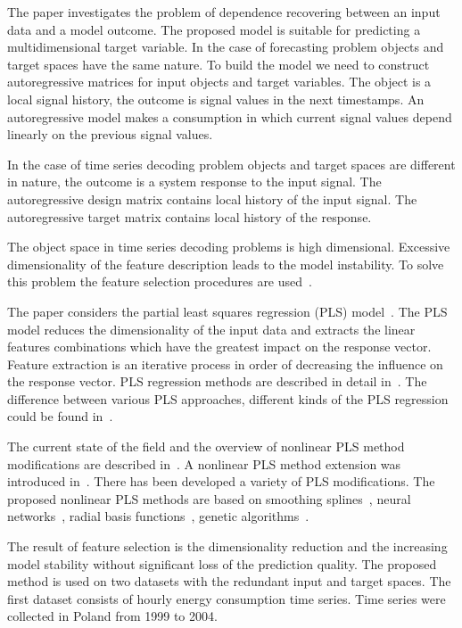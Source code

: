 \documentclass[preprint,12pt]{elsarticle}
\begin{document}
The paper investigates the problem of dependence recovering between an input data and a model outcome.
The proposed model is suitable for predicting a multidimensional target variable.
In the case of forecasting problem objects and target spaces have the same nature.
To build the model we need to construct autoregressive matrices for input objects and target variables.
The object is a local signal history, the outcome is signal values in the next timestamps.
An autoregressive model makes a consumption in which current signal values depend linearly on the previous signal values.

In the case of time series decoding problem objects and target spaces are different in nature, the outcome is a system response to the input signal.
The autoregressive design matrix contains local history of the input signal.
The autoregressive target matrix contains local history of the response.

The object space in time series decoding problems is high dimensional.
Excessive dimensionality of the feature description leads to the model instability.
To solve this problem the feature selection procedures are used~\cite{katrutsa2015qpfs,li2016feature}.

The paper considers the partial least squares regression (PLS) model~\cite{wegelin2000survey,abdi2003pls,geladi1986partial}.
The PLS model reduces the dimensionality of the input data and extracts the linear features combinations which have the greatest impact on the response vector.
Feature extraction is an iterative process in order of decreasing the influence on the response vector.
PLS regression methods are described in detail in~\cite{geladi1988pls, hoskuldsson1988plsr,de1993simpls}.
The difference between various PLS approaches, different kinds of the PLS regression could be found in~\cite{rosipal2006overview}.

The current state of the field and the overview of nonlinear PLS method modifications are described in~\cite{rosipal2011npls}.
A nonlinear PLS method extension was introduced in~\cite{wold1989nonlinear}.
There has been developed a variety of PLS modifications.
The proposed nonlinear PLS methods are based on smoothing splines~\cite{frank1990npls}, neural networks~\cite{qin1992npls}, radial basis functions~\cite{yan2003geneticpls}, genetic algorithms~\cite{hiden1998geneticpls}.

The result of feature selection is the dimensionality reduction and the increasing model stability without significant loss of the prediction quality.
The proposed method is used on two datasets with the redundant input and target spaces.
The first dataset consists of hourly energy consumption time series. 
Time series were collected in Poland from 1999 to 2004.
\end{document}
